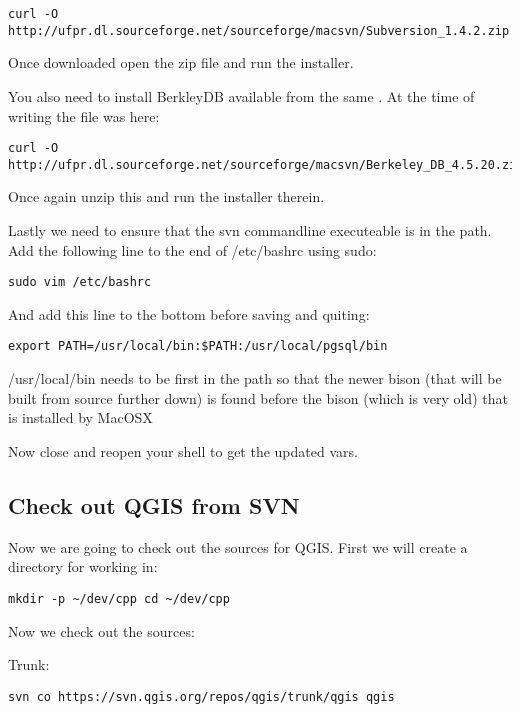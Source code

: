 \begin{verbatim}
curl -O http://ufpr.dl.sourceforge.net/sourceforge/macsvn/Subversion_1.4.2.zip 
\end{verbatim}

Once downloaded open the zip file and run the installer.

You also need to install BerkleyDB available from the same
. At the time of writing the
file was here:

\begin{verbatim}
curl -O http://ufpr.dl.sourceforge.net/sourceforge/macsvn/Berkeley_DB_4.5.20.zip 
\end{verbatim}

Once again unzip this and run the installer therein.

Lastly we need to ensure that the svn commandline executeable is in the path.
Add the following line to the end of /etc/bashrc using sudo:

\begin{verbatim}
sudo vim /etc/bashrc 
\end{verbatim}

And add this line to the bottom before saving and quiting:

\begin{verbatim}
export PATH=/usr/local/bin:$PATH:/usr/local/pgsql/bin 
\end{verbatim}

/usr/local/bin needs to be first in the path so that the newer bison (that will
be built from source further down) is found before the bison (which is very
old) that is installed by MacOSX

Now close and reopen your shell to get the updated vars.

\subsection{Check out QGIS from SVN}
Now we are going to check out the sources for QGIS. First we will create a
directory for working in:

\begin{verbatim}
mkdir -p ~/dev/cpp cd ~/dev/cpp 
\end{verbatim}

Now we check out the sources:

Trunk:

\begin{verbatim}
svn co https://svn.qgis.org/repos/qgis/trunk/qgis qgis 
\end{verbatim}

